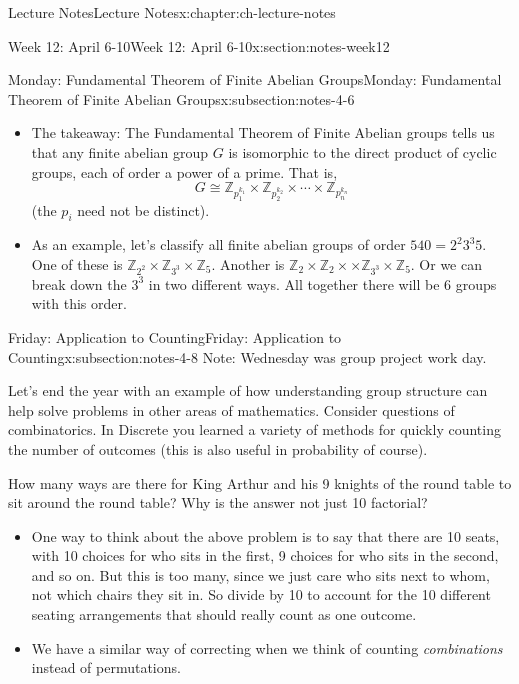 \documentclass[oneside,11pt,]{book}
\begin{document}
\begin{chapterptx}{Lecture Notes}{}{Lecture Notes}{}{}{x:chapter:ch-lecture-notes}
\begin{sectionptx}{Week 12: April 6-10}{}{Week 12: April 6-10}{}{}{x:section:notes-week12}
\begin{subsectionptx}{Monday: Fundamental Theorem of Finite Abelian Groups}{}{Monday: Fundamental Theorem of Finite Abelian Groups}{}{}{x:subsection:notes-4-6}
\begin{itemize}[label=\textbullet]
\item{}The takeaway: The Fundamental Theorem of Finite Abelian groups tells us that any finite abelian group \(G\) is isomorphic to the direct product of cyclic groups, each of order a power of a prime. That is,%
\begin{equation*}
G \cong \mathbb Z_{p_1^{k_1}}\times \mathbb Z_{p_2^{k_2}}\times \cdots \times\mathbb Z_{p_n^{k_n}}
\end{equation*}
(the \(p_i\) need not be distinct).%
\item{}As an example, let’s classify all finite abelian groups of order \(540 = 2^2 3^3 5\). One of these is \(\mathbb Z_{2^2} \times \mathbb Z_{3^3} \times \mathbb Z_5\). Another is \(\mathbb Z_{2}\times\mathbb Z_2\times\times \mathbb Z_{3^3} \times \mathbb Z_5\). Or we can break down the \(3^3\) in two different ways. All together there will be 6 groups with this order.%
\end{itemize}
%
\end{subsectionptx}
%
%
\typeout{************************************************}
\typeout{************************************************}
%
\begin{subsectionptx}{Friday: Application to Counting}{}{Friday: Application to Counting}{}{}{x:subsection:notes-4-8}
Note: Wednesday was group project work day.%
\par
Let’s end the year with an example of how understanding group structure can help solve problems in other areas of mathematics. Consider questions of combinatorics. In Discrete you learned a variety of methods for quickly counting the number of outcomes (this is also useful in probability of course).%
\par
How many ways are there for King Arthur and his 9 knights of the round table to sit around the round table? Why is the answer not just 10 factorial?%
\par
%
\begin{itemize}[label=\textbullet]
\item{}One way to think about the above problem is to say that there are 10 seats, with 10 choices for who sits in the first, 9 choices for who sits in the second, and so on. But this is too many, since we just care who sits next to whom, not which chairs they sit in. So divide by 10 to account for the 10 different seating arrangements that should really count as one outcome.%
\item{}We have a similar way of correcting when we think of counting \emph{combinations} instead of permutations.%

\end{itemize}
\end{subsectionptx}
\end{sectionptx}
\end{chapterptx}
\end{document}
